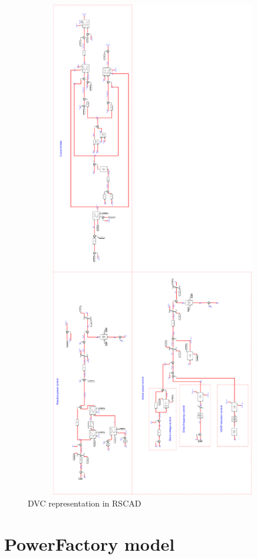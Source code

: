 \begin{figure}[H]
\centering
    \includegraphics[height = 22cm,width = 12.5cm]{Diagrams/Appendix_A/GSC_Control_RSCAD_2.pdf}
    \caption{DVC representation in RSCAD}
    \label{fig:GSC_Control_RSCAD_2}
\end{figure}

\section{PowerFactory model}\label{pfd_model_appen}

